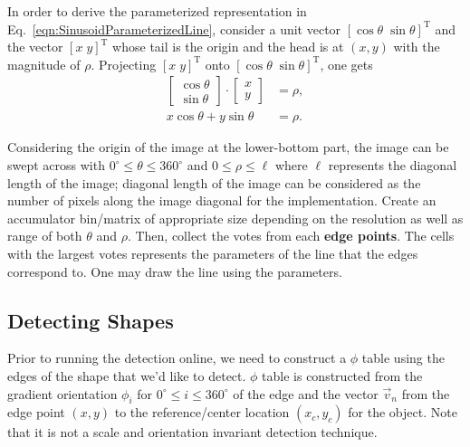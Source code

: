 \documentclass{report}
\begin{document}
In order to derive the parameterized representation in Eq.~\ref{eqn:SinusoidParameterizedLine}, consider a unit vector $[ \cos{\theta} \; \sin{\theta} ]^\text{T}$ and the vector $[x \; y]^{\text{T}}$ whose tail is the origin and the head is at $(x,y)$ with the magnitude of $\rho$. Projecting $[x \; y]^{\text{T}}$ onto $[ \cos{\theta} \; \sin{\theta} ]^\text{T}$, one gets
\begin{align}
	\begin{bmatrix}
		\cos{\theta} \\
		\sin{\theta}
	\end{bmatrix}
	\cdot
	\begin{bmatrix}
		x \\
		y
	\end{bmatrix}
	& = \rho, \\
	x \cos{\theta} + y \sin{\theta} & = \rho.
	\label{eqn:SinusoidParameterizedLineDerivation}
\end{align}

%	
%	

Considering the origin of the image at the lower-bottom part, the image can be swept across with $0^{\circ} \leq \theta \leq 360^{\circ}$ and $0 \leq \rho \leq \ell$ where $\ell$ represents the diagonal length of the image; diagonal length of the image can be considered as the number of pixels along the image diagonal for the implementation. Create an accumulator bin/matrix of appropriate size depending on the resolution as well as range of both $\theta$ and $\rho$. Then, collect the votes from each \textbf{edge points}. The cells with the largest votes represents the parameters of the line that the edges correspond to. One may draw the line using the parameters.


\subsection{Detecting Shapes}
\hspace{\parindent}Prior to running the detection online, we need to construct a $\phi$ table using the edges of the shape that we'd like to detect. $\phi$ table is constructed from the gradient orientation $\phi_i$ for $0^\circ \leq i \leq 360^\circ$ of the edge and the vector $\vec v_n$ from the edge point $(x, y)$ to the reference/center location $(x_c, y_c)$ for the object. Note that it is not a scale and orientation invariant detection technique.
\end{document}
